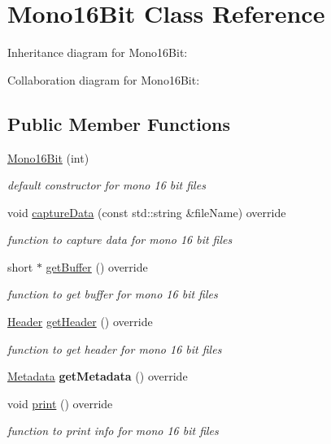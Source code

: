 \hypertarget{classMono16Bit}{}\section{Mono16\+Bit Class Reference}
\label{classMono16Bit}


Inheritance diagram for Mono16\+Bit\+:


Collaboration diagram for Mono16\+Bit\+:
\subsection*{Public Member Functions}
\begin{DoxyCompactItemize}
\item 
\mbox{\label{classMono16Bit_a0b769108bc9c45dbca7278466ba6fe72}} 
\hyperlink{classMono16Bit_a0b769108bc9c45dbca7278466ba6fe72}{Mono16\+Bit} (int)
\begin{DoxyCompactList}\small\item\em default constructor for mono 16 bit files \end{DoxyCompactList}\item 
void \hyperlink{classMono16Bit_adc338eb2b8f56cf676f55900e769e785}{capture\+Data} (const std\+::string \&file\+Name) override
\begin{DoxyCompactList}\small\item\em function to capture data for mono 16 bit files \end{DoxyCompactList}\item 
\mbox{\label{classMono16Bit_a29a22d477629b81497dd77cb52412e6d}} 
short $\ast$ \hyperlink{classMono16Bit_a29a22d477629b81497dd77cb52412e6d}{get\+Buffer} () override
\begin{DoxyCompactList}\small\item\em function to get buffer for mono 16 bit files \end{DoxyCompactList}\item 
\hyperlink{structHeader}{Header} \hyperlink{classMono16Bit_a1aee92e83b4d88385af39e00909afdaa}{get\+Header} () override
\begin{DoxyCompactList}\small\item\em function to get header for mono 16 bit files \end{DoxyCompactList}\item 
\mbox{\label{classMono16Bit_af99df7bc57d8279894239496d3a87c51}} 
\hyperlink{structMetadata}{Metadata} {\bfseries get\+Metadata} () override
\item 
\mbox{\label{classMono16Bit_a62ab5523e0e7cfee6672db83da2eb08e}} 
void \hyperlink{classMono16Bit_a62ab5523e0e7cfee6672db83da2eb08e}{print} () override
\begin{DoxyCompactList}\small\item\em function to print info for mono 16 bit files \end{DoxyCompactList}\end{DoxyCompactItemize}
